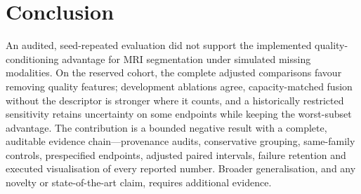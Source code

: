 \section{Conclusion}
\label{sec:conclusion} An audited, seed-repeated evaluation did not support the implemented quality-conditioning advantage for MRI segmentation under simulated missing modalities. On the reserved cohort, the complete adjusted comparisons favour removing quality features; development ablations agree, capacity-matched fusion without the descriptor is stronger where it counts, and a historically restricted sensitivity retains uncertainty on some endpoints while keeping the worst-subset advantage. The contribution is a bounded negative result with a complete, auditable evidence chain---provenance audits, conservative grouping, same-family controls, prespecified endpoints, adjusted paired intervals, failure retention and executed visualisation of every reported number. Broader generalisation, and any novelty or state-of-the-art claim, requires additional evidence.
